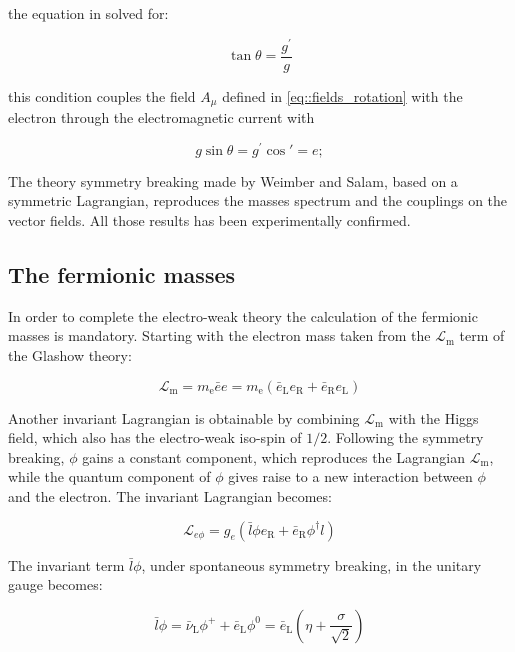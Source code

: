 the equation in solved for:

\begin{equation}
\tan\theta = \dfrac{g^{\prime}}{g}
\label{eq::matrix_solution}
\end{equation}

this condition couples the field $A_{\mu}$ defined in \autoref{eq::fields_rotation} with the electron through the electromagnetic current with

\begin{equation}
g\sin\theta = g^{\prime} \cos\prime = e; 
\end{equation}

The theory symmetry breaking made by Weimber and Salam, based on a symmetric Lagrangian, reproduces the masses spectrum and the couplings on the vector fields. All those results has been experimentally confirmed.

\subsection{The fermionic masses}

In order to complete the electro-weak theory the calculation of the fermionic masses is mandatory. Starting with the electron mass taken from the $\mathcal{L}_{\text{m}}$ term of the Glashow theory:

\begin{equation}
\mathcal{L}_{\text{m}} = m_{\text{e}}\bar{e}e = m_{\text{e}}(\bar{e}_{\text{L}}e_{\text{R}} + \bar{e}_{\text{R}}e_{\text{L}})
\end{equation}

Another invariant Lagrangian is obtainable by combining $\mathcal{L}_{\text{m}}$ with the Higgs field, which also has the electro-weak iso-spin of $1/2$. Following the symmetry breaking, $\phi$ gains a constant component, which reproduces the Lagrangian  $\mathcal{L}_{\text{m}}$, while the quantum component of $\phi$ gives raise to a new interaction between $\phi$ and the electron. The invariant Lagrangian becomes:

\begin{equation}
\mathcal{L}_{e\phi} = g_{e} (\bar{l}\phi e_{\text{R}} + \bar{e}_{\text{R}}\phi^{\dagger}l)
\end{equation}

The invariant term $\bar{l}\phi$, under spontaneous symmetry breaking, in the unitary gauge becomes:

\begin{equation}
\bar{l}\phi = \bar{\nu}_{\text{L}}\phi^{+} + \bar{e}_{\text{L}}\phi^{0} = \bar{e}_{\text{L}}\left(\eta + \dfrac{\sigma}{\sqrt{2}}\right)
\end{equation}

